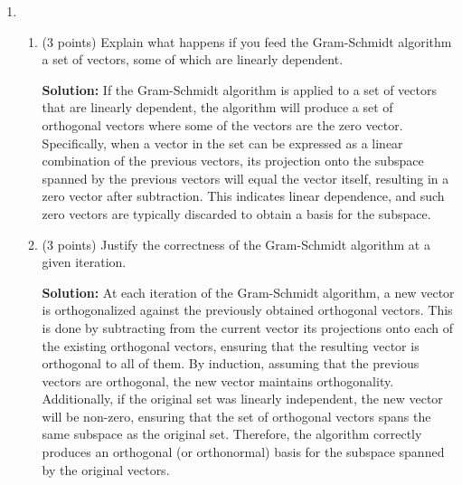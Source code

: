 \documentclass[12pt]{article}
\newcommand{\qspace}{\vspace{1em}} %
\newenvironment{solution}{\noindent\textbf{Solution:} }{\qspace}
\begin{document}
\begin{enumerate}
\begin{enumerate}
        \item (3 points) True/False: A square matrix must have at least one real eigenvalue.

        \begin{solution}
        \textbf{False.} Not all square matrices have real eigenvalues. For example, the matrix \( A = \begin{pmatrix} 0 & -1 \\ 1 & 0 \end{pmatrix} \) has eigenvalues \( i \) and \( -i \), which are complex and not real.
        \end{solution}
    
    \end{enumerate}

    \item 
    \begin{enumerate}
        \item (3 points) Explain what happens if you feed the Gram-Schmidt algorithm a set of vectors, some of which are linearly dependent.
    
        \begin{solution}
        If the Gram-Schmidt algorithm is applied to a set of vectors that are linearly dependent, the algorithm will produce a set of orthogonal vectors where some of the vectors are the zero vector. Specifically, when a vector in the set can be expressed as a linear combination of the previous vectors, its projection onto the subspace spanned by the previous vectors will equal the vector itself, resulting in a zero vector after subtraction. This indicates linear dependence, and such zero vectors are typically discarded to obtain a basis for the subspace.
        \end{solution}
    
        \item (3 points) Justify the correctness of the Gram-Schmidt algorithm at a given iteration.
    
        \begin{solution}
        At each iteration of the Gram-Schmidt algorithm, a new vector is orthogonalized against the previously obtained orthogonal vectors. This is done by subtracting from the current vector its projections onto each of the existing orthogonal vectors, ensuring that the resulting vector is orthogonal to all of them. By induction, assuming that the previous vectors are orthogonal, the new vector maintains orthogonality. Additionally, if the original set was linearly independent, the new vector will be non-zero, ensuring that the set of orthogonal vectors spans the same subspace as the original set. Therefore, the algorithm correctly produces an orthogonal (or orthonormal) basis for the subspace spanned by the original vectors.
        \end{solution}
    \end{enumerate}
    

\end{enumerate}
\end{document}

